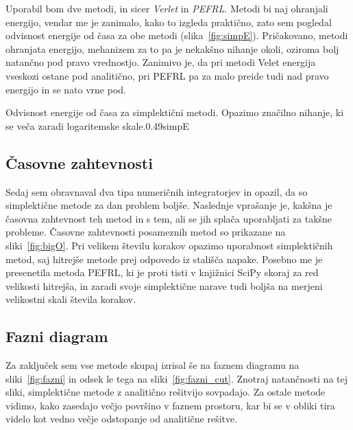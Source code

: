 \documentclass{porocilo}
\begin{document}
Uporabil bom dve metodi, in sicer \textit{Verlet} in \textit{PEFRL}. Metodi bi naj ohranjali energijo, vendar me je zanimalo, kako to izgleda praktično, zato sem pogledal odvisnost energije od časa za obe metodi (slika~\ref{fig:simpE}). Pričakovano, metodi ohranjata energijo, mehanizem za to pa je nekakšno nihanje okoli, oziroma bolj natančno pod pravo vrednostjo. Zanimivo je, da pri metodi Velet energija vseskozi ostane pod analitično, pri PEFRL pa za malo preide tudi nad pravo energijo in se nato vrne pod.

\begin{multifig}{2}{Odvisnost energije od časa za simplektični metodi. Opazimo značilno nihanje, ki se veča zaradi logaritemske skale.}{0.49}{simpE}
\end{multifig}

\subsection{Časovne zahtevnosti}
Sedaj sem obravnaval dva tipa numeričnih integratorjev in opazil, da so simplektične metode za dan problem boljše. Naslednje vprašanje je, kakšna je časovna zahtevnost teh metod in s tem, ali se jih splača uporabljati za takšne probleme. Časovne zahtevnosti posameznih metod so prikazane na sliki~\ref{fig:bigO}. Pri velikem številu korakov opazimo uporabnost simplektičnih metod, saj hitrejše metode prej odpovedo iz stališča napake. Posebno me je presenetila metoda PEFRL, ki je proti tisti v  knjižnici SciPy skoraj za red velikosti hitrejša, in zaradi svoje simplektične narave tudi boljša na merjeni velikostni skali števila korakov.


\subsection{Fazni diagram}
Za zaključek sem vse metode skupaj izrisal še na faznem diagramu na sliki~\ref{fig:fazni} in odsek le tega na sliki~\ref{fig:fazni_cut}. Znotraj natančnosti na tej sliki, simplektične metode z analitično rešitvijo sovpadajo. Za ostale metode vidimo, kako zasedajo večjo površino v faznem prostoru, kar bi se v obliki tira videlo kot vedno večje odstopanje od analitične rešitve.
\end{document}
